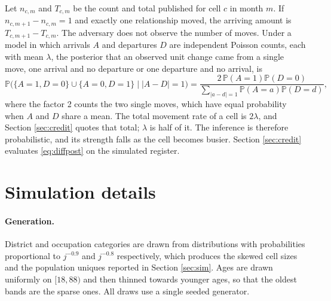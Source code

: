 \documentclass[11pt,a4paper]{article}
\theoremstyle{plain}
\theoremstyle{definition}
\theoremstyle{definition}
\theoremstyle{plain}
\newcommand{\Prob}{\mathbb{P}}
\begin{document}
Let $n_{c,m}$ and $T_{c,m}$ be the count and total published for cell $c$ in month
$m$. If $n_{c,m+1}-n_{c,m}=1$ and exactly one relationship moved, the arriving
amount is $T_{c,m+1}-T_{c,m}$. The adversary does not observe the number of moves.
Under a model in which arrivals $A$ and departures $D$ are independent Poisson
counts, each with mean $\lambda$, the posterior that an observed unit change came
from a single move, one arrival and no departure or one departure and no arrival,
is
\begin{equation}
\Prob\bigl(\{A=1,D=0\}\cup\{A=0,D=1\}\mid |A-D|=1\bigr)
=\frac{2\,\Prob(A=1)\Prob(D=0)}
 {\sum_{|a-d|=1}\Prob(A=a)\Prob(D=d)} ,
\label{eq:diffpost}
\end{equation}
where the factor 2 counts the two single moves, which have equal probability when
$A$ and $D$ share a mean. The total movement rate of a cell is $2\lambda$, and
Section \ref{sec:credit} quotes that total; $\lambda$ is half of it.
The inference is therefore probabilistic, and its strength falls as the cell
becomes busier. Section \ref{sec:credit} evaluates \eqref{eq:diffpost} on the
simulated register.

\section{Simulation details}\label{app:sim}

\paragraph{Generation.} District and occupation categories are drawn from
distributions with probabilities proportional to $j^{-0.9}$ and $j^{-0.8}$
respectively, which produces the skewed cell sizes and the population uniques
reported in Section \ref{sec:sim}. Ages are drawn uniformly on $[18, 88)$ and
then thinned towards younger ages, so that the oldest bands are the sparse ones.
All draws use a single seeded generator.
\end{document}
